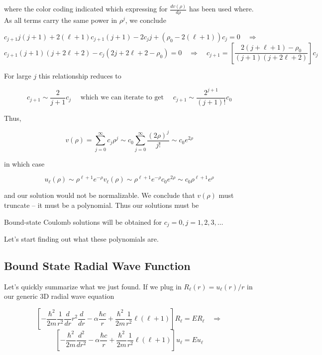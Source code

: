 where the color coding indicated which expressing for $ \frac{d v(\rho)}{d
\rho}$ has been used where. As all terms carry the same power in $\rho^j$, we
conclude 

\[c_{j+1} j(j+1) + 2(\ell +1) c_{j+1} (j+1) - 2c_j j + (\rho_0 - 2(\ell +1))c_j
= 0\quad \Rightarrow \] 
\[ c_{j+1} (j+1)(j+2\ell +2) - c_j (2j + 2\ell + 2 - \rho_0) = 0 \quad
  \Rightarrow \quad c_{j+1} = \left[ \frac{2(j+\ell +1) - \rho_0}{(j+1)(j+2\ell + 2)}
  \right] c_j \] \vspace{3px}


For large $j$ this relationship reduces to 

\[
  c_{j+1} \sim \frac{2}{j+1}c_j \quad \text{ which we can iterate to get
  } \quad c_{j+1}
  \sim \frac{2^{j+1}}{(j+1)!}c_0
\] \vspace{3px}

Thus, 

\[
v(\rho) = \sum_{j=0}^{\infty} c_j \rho^j \sim c_0 \sum_{j=0}^{\infty}
\frac{(2\rho)^j}{j!} \sim c_0 e^{2\rho}
\] \vspace{3px}

in which case 

\[
  u_\ell (\rho) \sim \rho^{\ell +1} e^{-\rho} v_\ell (\rho) \sim \rho^{\ell +1}
  e^{-\rho} c_0 e^{2\rho} \sim c_0 \rho^{\ell +1} e^{\rho}
\] \vspace{3px}

and our solution would not be normalizable. We conclude that $v(\rho)$ must
truncate -- it must be a polynomial. Thus our solutions must be 

\begin{subbox}{}
  Bound-state Coulomb solutions will be obtained for $c_j = 0, j = 1, 2, 3,
  \hdots$
\end{subbox}

Let's start finding out what these polynomials are. 


\subsection{Bound State Radial Wave Function}

Let's quickly summarize what we just found. If we plug in $R_\ell (r) = u_\ell
(r) / r$ in our generic 3D radial wave equation 

\[\left[ -\frac{\hbar^2}{2m} \frac{1}{r^2} \frac{d }{d r} r^2 \frac{d }{d r} - \alpha
\frac{\hbar c}{r} + \frac{\hbar^2}{2m} \frac{1}{r^2} \ell (\ell +1) \right]
R_\ell = ER_\ell  \quad \Rightarrow \] 
\[\left[ -\frac{\hbar^2}{2m}  \frac{d^2 }{d r^2} - \alpha \frac{\hbar c}{r}
  + \frac{\hbar^2}{2m} \frac{1}{r^2} \ell (\ell +1) \right] u_\ell = Eu_\ell
\] \vspace{3px}


